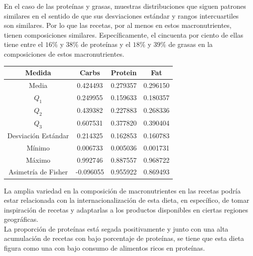 \documentclass[12pt,a4paper]{article}
\begin{document}
            En el caso de las proteínas y grasas, muestras distribuciones que siguen 
            patrones similares en el sentido de que sus desviaciones estándar y rangos 
            intercuartiles son similares. Por lo que las recetas, por al menos en estos 
            macronutrientes, tienen composiciones similares. Específicamente, el cincuenta 
            por ciento de ellas tiene entre el $16\%$ y $38\%$ de proteínas	y el $18\%$ y 
            $39\%$ de grasas en la composiciones de estos macronutrientes.

            \begin{center}
                \begin{tabular}{| c | c c c |}
                    \toprule
                    Medida & Carbs & Protein & Fat \\
                    \midrule
                    Media               & 0.424493 & 0.279357 & 0.296150  \\
                    $Q_1$               & 0.249955 & 0.159633 & 0.180357  \\
                    $Q_2$               & 0.439382 & 0.227883 & 0.268336  \\
                    $Q_3$               & 0.607531 & 0.377820 & 0.390404  \\
                    Desviación Estándar & 0.214325 & 0.162853 & 0.160783  \\
                    Mínimo              & 0.006733 & 0.005036 & 0.001731  \\
                    Máximo              & 0.992746 & 0.887557 & 0.968722  \\
                    Asimetría de Fisher & -0.096055 & 0.955922 & 0.869493 \\
                    \bottomrule
                \end{tabular}
            \end{center}

            La amplia variedad en la composición de macronutrientes en las recetas podría 
            estar relacionada con la internacionalización de esta dieta, en específico, de 
            tomar inspiración de recetas y adaptarlas a los productos disponibles en 
            ciertas regiones geográficas.\\

            La proporción de proteínas está segada positivamente y junto con una 
            alta acumulación de recetas con bajo porcentaje de proteínas, se tiene que 
            esta dieta figura como una con bajo consumo de alimentos ricos en proteínas. 
            
\end{document}
